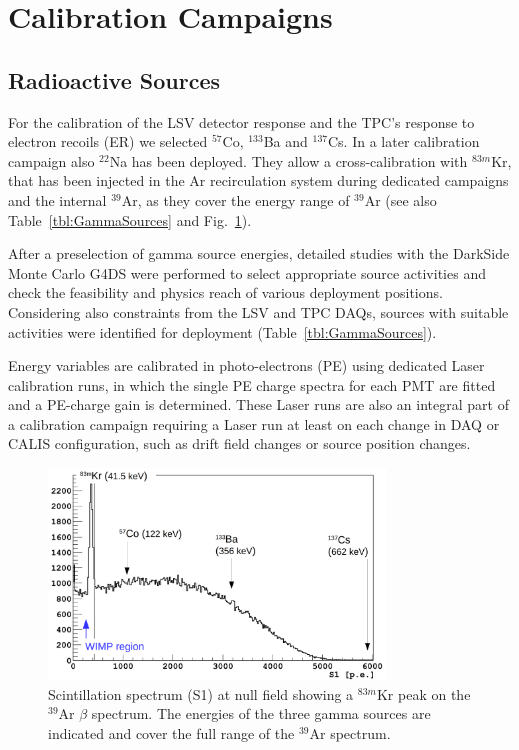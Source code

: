 \section{Calibration Campaigns}
\subsection{Radioactive Sources}
For the calibration of the LSV detector response and the TPC's response to electron recoils (ER) we selected $^{57}$Co, $^{133}$Ba and $^{137}$Cs. In a later calibration campaign also $^{22}$Na has been deployed. They allow a cross-calibration with $^{83m}$Kr, that has been injected in the Ar recirculation system during dedicated campaigns and the internal $^{39}$Ar, as they cover the energy range of $^{39}$Ar (see also Table~\ref{tbl:GammaSources} and Fig.~\ref{fig:GammaSources_Ar39spectrum}). %

After a preselection of gamma source energies, detailed studies with the DarkSide Monte Carlo G4DS \cite{DS50:G4DS:paper} were performed to select appropriate source activities and check the feasibility and physics reach of various deployment positions. Considering also constraints from the LSV and TPC DAQs, sources with suitable activities were identified for deployment (Table~\ref{tbl:GammaSources}).

Energy variables are calibrated in photo-electrons (PE) using dedicated Laser calibration runs, in which the single PE charge spectra for each PMT are fitted and a PE-charge gain is determined. 
These Laser runs are also an integral part of a calibration campaign requiring a Laser run at least on each change in DAQ or CALIS configuration, such as drift field changes or source position changes.

\begin{figure}[htbp]
 \centering
 \includegraphics[width=0.8\textwidth]{Figures/GammaSources_Ar39spectrum.png}
 \caption{Scintillation spectrum (S1) at null field showing a $^{83m}$Kr peak on the $^{39}$Ar $\beta$ spectrum. The energies of the three gamma sources are indicated and cover the full range of the $^{39}$Ar spectrum.
\label{fig:GammaSources_Ar39spectrum}}
\end{figure}

